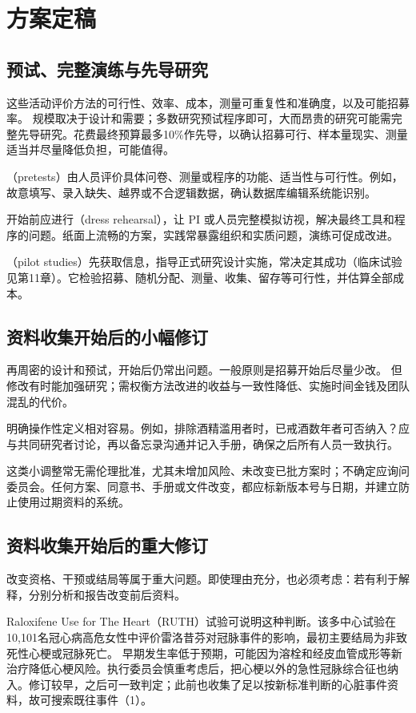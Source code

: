 \section{方案定稿}
\subsection{预试、完整演练与先导研究}
这些活动评价方法的可行性、效率、成本，测量可重复性和准确度，以及可能招募率。
规模取决于设计和需要；多数研究预试程序即可，大而昂贵的研究可能需完整先导研究。花费最终预算最多10\%作先导，以确认招募可行、样本量现实、测量适当并尽量降低负担，可能值得。

（pretests）由人员评价具体问卷、测量或程序的功能、适当性与可行性。例如，故意填写、录入缺失、越界或不合逻辑数据，确认数据库编辑系统能识别。

开始前应进行（dress rehearsal），让 PI 或人员完整模拟访视，解决最终工具和程序的问题。纸面上流畅的方案，实践常暴露组织和实质问题，演练可促成改进。

（pilot studies）先获取信息，指导正式研究设计实施，常决定其成功（临床试验见第11章）。它检验招募、随机分配、测量、收集、留存等可行性，并估算全部成本。

\subsection{资料收集开始后的小幅修订}
再周密的设计和预试，开始后仍常出问题。一般原则是招募开始后尽量少改。
但修改有时能加强研究；需权衡方法改进的收益与一致性降低、实施时间金钱及团队混乱的代价。

明确操作性定义相对容易。例如，排除酒精滥用者时，已戒酒数年者可否纳入？应与共同研究者讨论，再以备忘录沟通并记入手册，确保之后所有人员一致执行。

这类小调整常无需伦理批准，尤其未增加风险、未改变已批方案时；不确定应询问委员会。任何方案、同意书、手册或文件改变，都应标新版本号与日期，并建立防止使用过期资料的系统。

\subsection{资料收集开始后的重大修订}
改变资格、干预或结局等属于重大问题。即使理由充分，也必须考虑：若有利于解释，分别分析和报告改变前后资料。

Raloxifene Use for The Heart（RUTH）试验可说明这种判断。该多中心试验在10,101名冠心病高危女性中评价雷洛昔芬对冠脉事件的影响，最初主要结局为非致死性心梗或冠脉死亡。
早期发生率低于预期，可能因为溶栓和经皮血管成形等新治疗降低心梗风险。执行委员会慎重考虑后，把心梗以外的急性冠脉综合征也纳入。修订较早，之后可一致判定；此前也收集了足以按新标准判断的心脏事件资料，故可搜索既往事件（1）。

